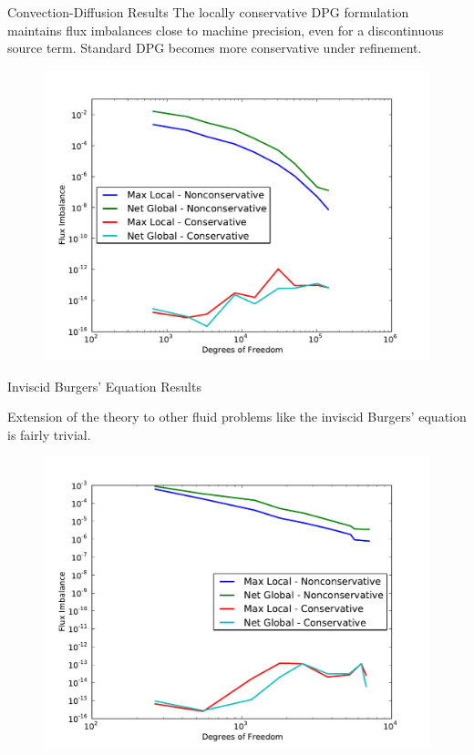 \documentclass[final]{beamer}
\newlength{\onecolwid}
\begin{document}
\begin{frame}[t]
\begin{columns}[t]
\begin{column}{\onecolwid}
\begin{block}{Convection-Diffusion Results}
\vspace{3ex}
The locally conservative DPG formulation maintains flux imbalances
close to machine precision, even for a discontinuous source term. Standard DPG
becomes more conservative under refinement.
\begin{figure}
\includegraphics[width=0.8\linewidth]{figs/Discontinuous/modifiedFlux.pdf}
\end{figure}

\end{block}

\begin{block}{Inviscid Burgers' Equation Results}

Extension of the theory to other fluid problems like the inviscid Burgers'
equation is fairly trivial.
\begin{figure}
\includegraphics[width=0.8\linewidth]{figs/Burgers/graphFlux.pdf}
\end{figure}


\end{block}
\end{column}
\end{columns}
\end{frame}
\end{document}
